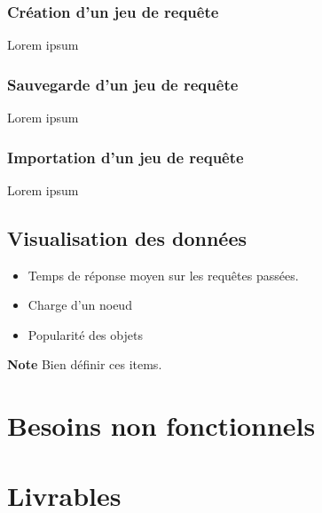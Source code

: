 \documentclass[12pt]{article}
\begin{document}
\subsubsection{Création d'un jeu de requête}
Lorem ipsum

\subsubsection{Sauvegarde d'un jeu de requête}
Lorem ipsum

\subsubsection{Importation d'un jeu de requête}
Lorem ipsum



\subsection{Visualisation des données}

\begin{itemize}
 \item Temps de réponse moyen sur les requêtes passées.
 \item Charge d'un noeud
 \item Popularité des objets
\end{itemize}


\textbf{Note } Bien définir ces items. \newline


\newpage

\section{Besoins non fonctionnels}




\newpage

\section{Livrables}
\end{document}
